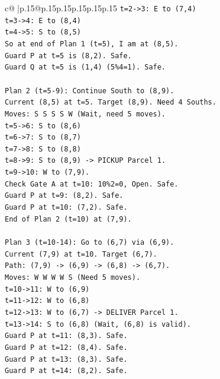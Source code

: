 \documentclass{article}
\begin{document}
{\begin{supertabular}{c@{$\;$}|p{.15\linewidth}@{}p{.15\linewidth}p{.15\linewidth}p{.15\linewidth}p{.15\linewidth}p{.15\linewidth}}
{{{\texttt{t=2{-}>3: E to (7,4)} \\
\texttt{t=3{-}>4: E to (8,4)} \\
\texttt{t=4{-}>5: S to (8,5)} \\
\texttt{So at end of Plan 1 (t=5), I am at (8,5).} \\
\texttt{Guard P at t=5 is (8,2). Safe.} \\
\texttt{Guard Q at t=5 is (1,4) (5\%4=1). Safe.} \\
\\ 
\texttt{Plan 2 (t=5{-}9): Continue South to (8,9).} \\
\texttt{Current (8,5) at t=5. Target (8,9). Need 4 Souths.} \\
\texttt{Moves: S S S S W (Wait, need 5 moves).} \\
\texttt{t=5{-}>6: S to (8,6)} \\
\texttt{t=6{-}>7: S to (8,7)} \\
\texttt{t=7{-}>8: S to (8,8)} \\
\texttt{t=8{-}>9: S to (8,9) {-}> PICKUP Parcel 1.} \\
\texttt{t=9{-}>10: W to (7,9).} \\
\texttt{Check Gate A at t=10: 10\%2=0, Open. Safe.} \\
\texttt{Guard P at t=9: (8,2). Safe.} \\
\texttt{Guard P at t=10: (7,2). Safe.} \\
\texttt{End of Plan 2 (t=10) at (7,9).} \\
\\ 
\texttt{Plan 3 (t=10{-}14): Go to (6,7) via (6,9).} \\
\texttt{Current (7,9) at t=10. Target (6,7).} \\
\texttt{Path: (7,9) {-}> (6,9) {-}> (6,8) {-}> (6,7).} \\
\texttt{Moves: W W W W S (Need 5 moves).} \\
\texttt{t=10{-}>11: W to (6,9)} \\
\texttt{t=11{-}>12: W to (6,8)} \\
\texttt{t=12{-}>13: W to (6,7) {-}> DELIVER Parcel 1.} \\
\texttt{t=13{-}>14: S to (6,8) (Wait, (6,8) is valid).} \\
\texttt{Guard P at t=11: (8,3). Safe.} \\
\texttt{Guard P at t=12: (8,4). Safe.} \\
\texttt{Guard P at t=13: (8,3). Safe.} \\
\texttt{Guard P at t=14: (8,2). Safe.} \\
}}}
\end{supertabular}}
\end{document}
